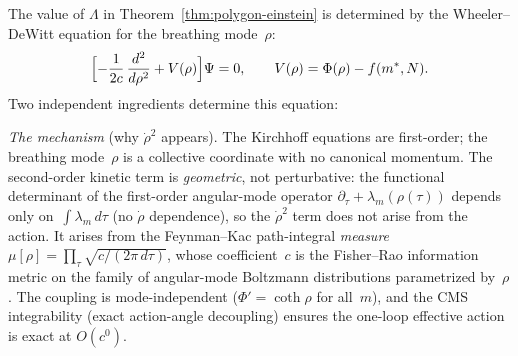 \begin{proposition}
\label{prop:wdw-lambda}
The value of $\Lambda$ in
Theorem~\ref{thm:polygon-einstein} is determined by the
Wheeler--DeWitt equation for the breathing mode~$\rho$:
\[
  \Bigl[-\frac{1}{2c}\,\frac{d^2}{d\rho^2}
  + V(\rho)\Bigr]\Psi = 0,
  \qquad V(\rho) = \Phi(\rho) - f(m^*,N).
\]
Two independent ingredients determine this equation:

\emph{The mechanism} (why $\dot\rho^2$ appears).
The Kirchhoff equations are first-order; the breathing
mode~$\rho$ is a collective coordinate with no canonical momentum.
The second-order kinetic term is \emph{geometric}, not perturbative:
the functional determinant of the first-order angular-mode operator
$\partial_\tau + \lambda_m(\rho(\tau))$ depends only
on~$\int\!\lambda_m\,d\tau$ (no $\dot\rho$ dependence),
so the $\dot\rho^2$ term does not arise from the action.
It arises from the Feynman--Kac path-integral \emph{measure}
$\mu[\rho] = \prod_\tau\!\sqrt{c/(2\pi\,d\tau)}$, whose
coefficient~$c$ is the Fisher--Rao information metric on the
family of angular-mode Boltzmann distributions parametrized by~$\rho$.
The coupling is mode-independent ($\Phi' = \coth\rho$ for all~$m$),
and the CMS integrability (exact action-angle decoupling) ensures
the one-loop effective action is exact at $O(c^0)$.


\end{proposition}
